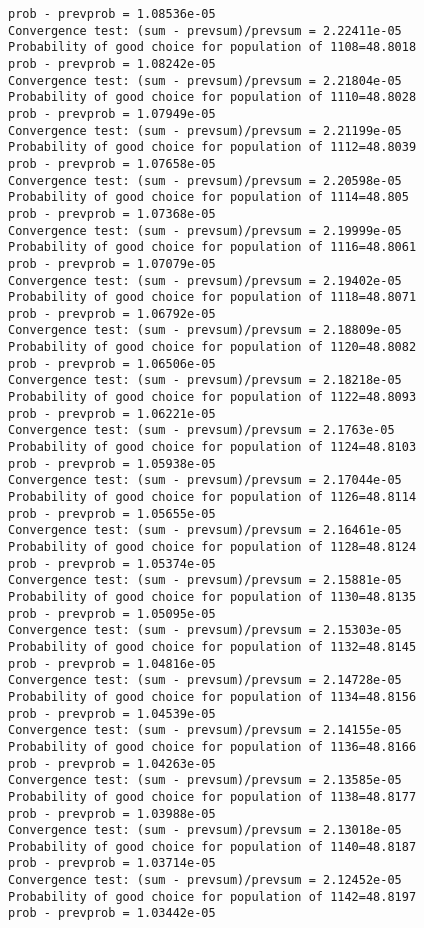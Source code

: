 \documentclass[11pt,onecolumn]{article}
\begin{document}
\begin{verbatim}
prob - prevprob = 1.08536e-05
Convergence test: (sum - prevsum)/prevsum = 2.22411e-05
Probability of good choice for population of 1108=48.8018
prob - prevprob = 1.08242e-05
Convergence test: (sum - prevsum)/prevsum = 2.21804e-05
Probability of good choice for population of 1110=48.8028
prob - prevprob = 1.07949e-05
Convergence test: (sum - prevsum)/prevsum = 2.21199e-05
Probability of good choice for population of 1112=48.8039
prob - prevprob = 1.07658e-05
Convergence test: (sum - prevsum)/prevsum = 2.20598e-05
Probability of good choice for population of 1114=48.805
prob - prevprob = 1.07368e-05
Convergence test: (sum - prevsum)/prevsum = 2.19999e-05
Probability of good choice for population of 1116=48.8061
prob - prevprob = 1.07079e-05
Convergence test: (sum - prevsum)/prevsum = 2.19402e-05
Probability of good choice for population of 1118=48.8071
prob - prevprob = 1.06792e-05
Convergence test: (sum - prevsum)/prevsum = 2.18809e-05
Probability of good choice for population of 1120=48.8082
prob - prevprob = 1.06506e-05
Convergence test: (sum - prevsum)/prevsum = 2.18218e-05
Probability of good choice for population of 1122=48.8093
prob - prevprob = 1.06221e-05
Convergence test: (sum - prevsum)/prevsum = 2.1763e-05
Probability of good choice for population of 1124=48.8103
prob - prevprob = 1.05938e-05
Convergence test: (sum - prevsum)/prevsum = 2.17044e-05
Probability of good choice for population of 1126=48.8114
prob - prevprob = 1.05655e-05
Convergence test: (sum - prevsum)/prevsum = 2.16461e-05
Probability of good choice for population of 1128=48.8124
prob - prevprob = 1.05374e-05
Convergence test: (sum - prevsum)/prevsum = 2.15881e-05
Probability of good choice for population of 1130=48.8135
prob - prevprob = 1.05095e-05
Convergence test: (sum - prevsum)/prevsum = 2.15303e-05
Probability of good choice for population of 1132=48.8145
prob - prevprob = 1.04816e-05
Convergence test: (sum - prevsum)/prevsum = 2.14728e-05
Probability of good choice for population of 1134=48.8156
prob - prevprob = 1.04539e-05
Convergence test: (sum - prevsum)/prevsum = 2.14155e-05
Probability of good choice for population of 1136=48.8166
prob - prevprob = 1.04263e-05
Convergence test: (sum - prevsum)/prevsum = 2.13585e-05
Probability of good choice for population of 1138=48.8177
prob - prevprob = 1.03988e-05
Convergence test: (sum - prevsum)/prevsum = 2.13018e-05
Probability of good choice for population of 1140=48.8187
prob - prevprob = 1.03714e-05
Convergence test: (sum - prevsum)/prevsum = 2.12452e-05
Probability of good choice for population of 1142=48.8197
prob - prevprob = 1.03442e-05

\end{verbatim}
\end{document}
